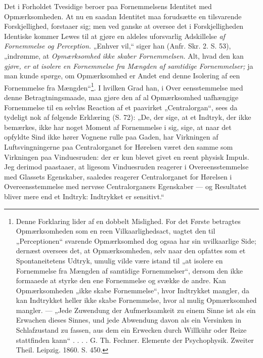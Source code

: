 \documentclass[11pt]{book}
\newcommand{\opage}[1]{\marginnote{\footnotesize\textit{[#1]}}}
\begin{document}
Det i Forholdet Tvesidige beroer paa Fornemmelsens Identitet med
Opmærksomheden. At nu en saadan Identitet maa forudsætte en
tilsvarende Forskjellighed, forstaaer sig; men ved ganske at oversee
det i Forskjelligheden Identiske kommer Lewes til at gjøre en aldeles
uforsvarlig Adskillelse \emph{af Fornemmelse og Perception.} „Enhver
vil,“ siger han (Anfr. Skr. 2. S. 53), „indrømme, at
\emph{Opmærksomhed ikke skaber Fornemmelsen.} Alt, hvad den kan
\emph{gjøre, er at isolere en Fornemmelse fra Mængden af samtidige
Fornemmelser;} ja man kunde spørge, om Opmærksomhed er Andet end
denne Isolering af een Fornemmelse fra
Mængden“\footnote{Denne Forklaring lider af en dobbelt Mislighed. For
det Første betragtes Opmærksomheden som en reen Vilkaarlighedsact,
uagtet den til „Perceptionen“ svarende Opmærksomhed dog ogsaa har sin
uvilkaarlige Side; dernæst oversees det, at Opmærksomheden, selv naar
den opfattes som et Spontaneitetens Udtryk, umulig vilde være istand
til „at isolere en Fornemmelse fra Mængden af samtidige
Fornemmelser“, dersom den ikke formaaede at styrke den ene
Fornemmelse og svække de andre. Kan Opmærksomheden „ikke skabe
Fornemmelse“, hvor Indtrykket mangler, da kan Indtrykket heller ikke
skabe Fornemmelse, hvor al mulig Opmærksomhed mangler. --- „Jede
Zuwendung der Aufmerksamkeit zu einem Sinne ist als ein Erwachen
dieses Sinnes, und jede Abwendung davon als ein Versinken in
Schlafzustand zu fassen, aus dem ein Erwecken durch Willkühr oder
Reize stattfinden kann“ . . . . G. Th. Fechner. Elemente der
Psychophysik. Zweiter Theil. Leipzig. 1860. S. 450.}. I hvilken Grad
han, i Over\-%
\opage{373} \setcounter{footnote}{0}%
eensstemmelse med denne Betragtningsmaade, maa gjøre den af al
Opmærksomhed uafhængige Fornemmelse til en selvløs Reaction af et
paavirket „Centralorgan“, sees da tydeligt nok af følgende Erklæring
(S. 72): „De, der sige, at et Indtryk, der ikke bemærkes, ikke har
noget Moment af Fornemmelse i sig, sige, at naar det opfyldte Sind
ikke hører Vognene rulle paa Gaden, har Virkningen af
Luftsvingningerne paa Centralorganet for Hørelsen været den samme som
Virkningen paa Vinduesruden: der er kun blevet givet en reent physisk
Impuls. Jeg derimod paastaaer, at ligesom Vinduesruden reagerer i
Overeensstemmelse med Glassets Egenskaber, saaledes reagerer
Centralorganet for Hørelsen i Overeensstemmelse med nervøse
Centralorganers Egenskaber --- og Resultatet bliver mere end et
Indtryk: Indtrykket er sensitivt.“
\end{document}
